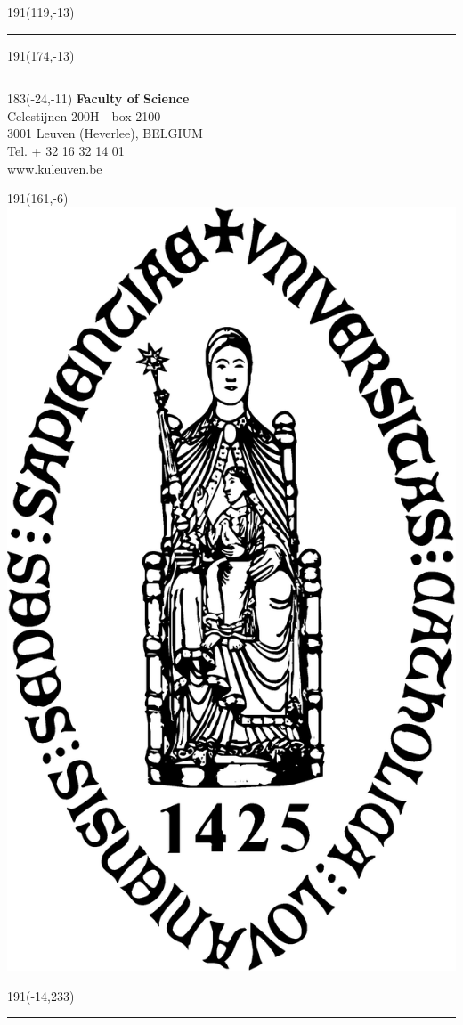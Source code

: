 \documentclass[
  12pt,
  a4paper,
  oneside]{book}
\begin{document}
\newpage
\backmatter
\thispagestyle{empty}
\sffamily
%
\begin{textblock}{191}(119,-13)
{\color{blueline}\rule{160pt}{5.5pt}}
\end{textblock}
%
\begin{textblock}{191}(174,-13)
{\color{blueline}\rule{5.5pt}{59pt}}
\end{textblock}
%
\begin{textblock}{183}(-24,-11)
\textblockcolour{}
\flushright
\fontsize{7}{7.5}\selectfont
\textbf{Faculty of Science}\\
Celestijnen 200H - box 2100\\
3001 Leuven (Heverlee), BELGIUM\\
Tel. + 32 16 32 14 01\\
www.kuleuven.be\\
\end{textblock}
%
\begin{textblock}{191}(161,-6)
\textblockcolour{}
\includegraphics*[height=16.5truemm]{Images/sedes}
\end{textblock}
%
\begin{textblock}{191}(-14,233)
{\color{bluetitle}\rule{544pt}{55pt}}
\end{textblock}
\end{document}
